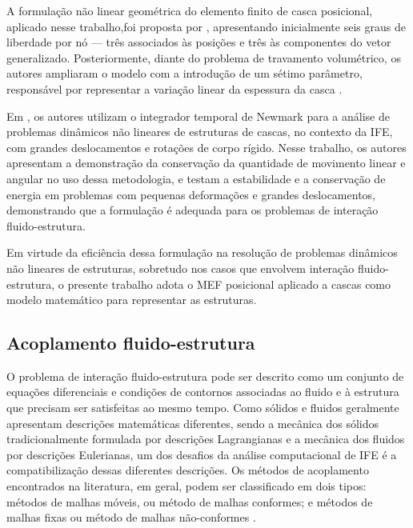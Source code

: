 A formulação não linear geométrica do elemento finito de casca posicional, aplicado nesse trabalho,foi proposta por \cite{CodaP:2007}, apresentando inicialmente seis graus de liberdade por nó — três associados às posições e três às componentes do vetor generalizado. Posteriormente, diante do problema de travamento volumétrico, os autores ampliaram o modelo com a introdução de um sétimo parâmetro, responsável por representar a variação linear da espessura da casca \cite{CodaP:2008}.

Em , os autores utilizam o integrador temporal de Newmark para a análise de problemas dinâmicos não lineares de estruturas de cascas, no contexto da IFE, com grandes deslocamentos e rotações de corpo rígido. Nesse trabalho, os autores apresentam a demonstração da conservação da quantidade de movimento linear e angular no uso dessa metodologia, e testam a estabilidade e a conservação de energia em problemas com pequenas deformações e grandes deslocamentos, demonstrando que a formulação é adequada para os problemas de interação fluido-estrutura.

Em virtude da eficiência dessa formulação na resolução de problemas dinâmicos não lineares de estruturas, sobretudo nos casos que envolvem interação fluido-estrutura, o presente trabalho adota o MEF posicional aplicado a cascas como modelo matemático para representar as estruturas.

\subsection{Acoplamento fluido-estrutura}
\label{couplingsection}

O problema de interação fluido-estrutura pode ser descrito como um conjunto de equações diferenciais e condições de contornos associadas ao fluido e à estrutura que precisam ser satisfeitas ao mesmo tempo. Como sólidos e fluidos geralmente apresentam descrições matemáticas diferentes, sendo a mecânica dos sólidos tradicionalmente formulada por descrições Lagrangianas e a mecânica dos fluidos por descrições Eulerianas, um dos desafios da análise computacional de IFE é a compatibilização dessas diferentes descrições. Os métodos de acoplamento encontrados na literatura, em geral, podem ser classificado em dois tipos: métodos de malhas móveis, ou método de malhas conformes; e métodos de malhas fixas ou método de malhas não-conformes \cite{BazilevsTT:2013b,Houetal:2012}.

